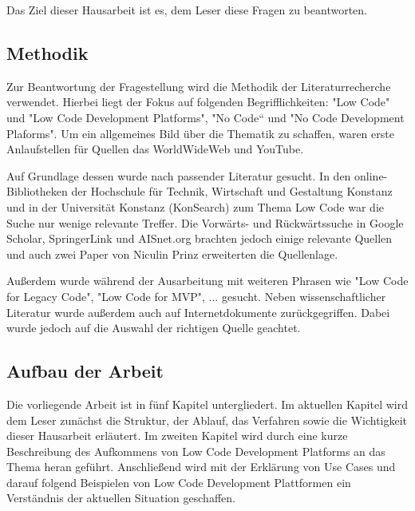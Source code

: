 \documentclass[12pt]{article} %
\begin{document}
	Das Ziel dieser Hausarbeit ist es, dem Leser diese Fragen zu beantworten. \newline
	
	\subsection{Methodik}
	
	
	
	Zur Beantwortung der Fragestellung wird die Methodik der Literaturrecherche verwendet. Hierbei liegt der Fokus auf folgenden Begrifflichkeiten:
	"Low Code" und "Low Code Development Platforms", "No Code“ und "No Code Development Plaforms". 
	Um ein allgemeines Bild über die Thematik zu schaffen, waren erste Anlaufstellen für Quellen das WorldWideWeb und YouTube.
	
	Auf Grundlage dessen wurde nach passender Literatur gesucht. 
	In den online-Bibliotheken der Hochschule für Technik, Wirtschaft und Gestaltung Konstanz und in der Universität Konstanz (KonSearch) zum Thema Low Code war die Suche nur wenige relevante Treffer. Die Vorwärts- und Rückwärtssuche in Google Scholar, SpringerLink und AISnet.org brachten jedoch einige relevante Quellen und auch zwei Paper von Niculin Prinz erweiterten die Quellenlage. %
	
	Außerdem wurde während der Ausarbeitung mit weiteren Phrasen wie "Low Code for Legacy Code", "Low Code for MVP", ... gesucht. \newline %
	Neben wissenschaftlicher Literatur wurde außerdem auch auf Internetdokumente zurückgegriffen. Dabei wurde jedoch auf die Auswahl der richtigen Quelle geachtet.
	
	\subsection{Aufbau der Arbeit}
	Die vorliegende Arbeit ist in fünf Kapitel untergliedert. Im aktuellen Kapitel wird dem Leser zunächst die Struktur, der Ablauf, das Verfahren sowie die Wichtigkeit dieser Hausarbeit erläutert.
	Im zweiten Kapitel wird durch eine kurze Beschreibung des Aufkommens von Low Code Development Platforms an das Thema heran geführt. Anschließend wird mit der Erklärung von Use Cases und darauf folgend Beispielen von Low Code Development Plattformen ein Verständnis der aktuellen Situation geschaffen.
	
\end{document}
